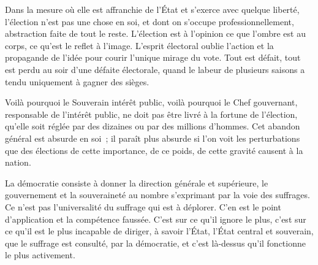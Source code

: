 \documentclass[french,twoside]{book} %
\newcommand{\astermono}{\medskip\centerline{\color{rubric}\large\selectfont{\syms ✻}}\medskip\par}%
\begin{document}
Dans la mesure où elle est affranchie de l’État et s’exerce avec quelque liberté, l’élection n’est pas une chose en soi, et dont on s’occupe professionnellement, abstraction faite de tout le reste. L’élection est à l’opinion ce que l’ombre est au corps, ce qu’est le reflet à l’image. L’esprit électoral oublie l’action et la propagande de l’idée pour courir l’unique mirage du vote. Tout est défait, tout est perdu au soir d’une défaite électorale, quand le labeur de plusieurs saisons a tendu uniquement à gagner des sièges.\par
Voilà pourquoi le Souverain intérêt public, voilà pourquoi le Chef gouvernant, responsable de l’intérêt public, ne doit pas être livré à la fortune de l’élection, qu’elle soit réglée par des dizaines ou par des millions d’hommes. Cet abandon général est absurde en soi ; il paraît plus absurde si l’on voit les perturbations que des élections de cette importance, de ce poids, de cette gravité causent à la nation.\par
La démocratie consiste à donner la direction générale et supérieure, le gouvernement et la souveraineté au nombre s’exprimant par la voie des suffrages. Ce n’est pas l’universalité du suffrage qui est à déplorer. C’en est le point d’application et la compétence faussée. C’est sur ce qu’il ignore le plus, c’est sur ce qu’il est le plus incapable de diriger, à savoir l’État, l’État central et souverain, que le suffrage est consulté, par la démocratie, et c’est là-dessus qu’il fonctionne le plus activement.\par

\astermono
\end{document}
